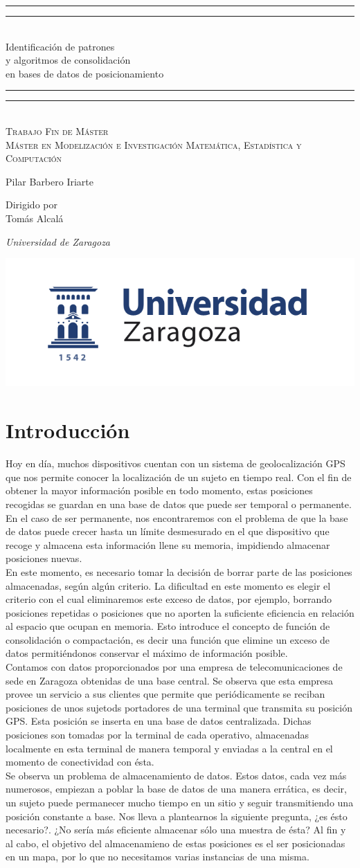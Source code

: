 \documentclass[a4paper, 12pt]{article}
\newcommand*{\plogo}{\includegraphics[scale=.45]{unizar.png}}
\newcommand*{\titleGP}{\begingroup %
\centering %
\vspace*{\baselineskip} %

\rule{\textwidth}{1.6pt}\vspace*{-\baselineskip}\vspace*{2pt} %
\rule{\textwidth}{0.4pt}\\[\baselineskip] %

{\LARGE Identificaci\'on de patrones \\[0.1\baselineskip] y algoritmos  de consolidaci\'on  \\[0.3\baselineskip] en bases de datos de posicionamiento}\\[0.2\baselineskip] %

\rule{\textwidth}{0.4pt}\vspace*{-\baselineskip}\vspace{3.2pt} %
\rule{\textwidth}{1.6pt}\\[\baselineskip] %

\scshape %
Trabajo Fin de M\'aster \\ %
M\'aster en Modelizaci\'on e Investigaci\'on Matem\'atica, Estad\'istica y Computaci\'on\\[\baselineskip] %
{\Large Pilar Barbero Iriarte\par} 

\vspace*{2\baselineskip} %

Dirigido por \\[\baselineskip]
Tom\'as Alcal\'a \par %
{\itshape Universidad de Zaragoza\par} %

\vfill %

\plogo \\[0.3\baselineskip] %

\endgroup}
\begin{document}
\titleGP %
\pagestyle{empty} %

\newpage\null\thispagestyle{empty}\newpage

\tableofcontents


\pagebreak


\section{Introducci\'on}

Hoy en d\'ia, muchos dispositivos cuentan con un sistema de geolocalizaci\'on GPS que nos permite conocer la localizaci\'on de un sujeto en tiempo real. Con el fin de obtener la mayor informaci\'on posible en todo momento, estas posiciones recogidas se guardan en una base de datos que puede ser temporal o permanente. En el caso de ser permanente, nos encontraremos con el problema de que la base de datos puede crecer hasta un l\'imite desmesurado en el que dispositivo que recoge y almacena esta informaci\'on llene su memoria, impidiendo almacenar posiciones nuevas. \\

En este momento, es necesario tomar la decisi\'on de borrar parte de las posiciones almacenadas, seg\'un alg\'un criterio. La dificultad en este momento es elegir el criterio con el cual eliminaremos este exceso de datos, por ejemplo, borrando posiciones repetidas o posiciones que no aporten la suficiente eficiencia en relaci\'on al espacio que ocupan en memoria. Esto introduce el concepto de funci\'on de consolidaci\'on o compactaci\'on, es decir una funci\'on que elimine un exceso de datos permiti\'endonos conservar el m\'aximo de informaci\'on posible. \\

Contamos con datos proporcionados por una empresa de telecomunicaciones de sede en Zaragoza obtenidas de una base central. Se observa que esta empresa provee un servicio a sus clientes que permite que peri\'odicamente se reciban posiciones de unos sujetods portadores de una terminal que transmita su posici\'on GPS. Esta posici\'on se inserta en una base de datos centralizada. Dichas posiciones son tomadas por la terminal de cada operativo, almacenadas localmente en esta terminal de manera temporal y enviadas a la central en el momento de conectividad con \'esta. \\

Se observa un problema de almacenamiento de datos. Estos datos, cada vez m\'as numerosos, empiezan a poblar la base de datos de una manera err\'atica, es decir, un sujeto puede permanecer mucho tiempo en un sitio y seguir transmitiendo una posici\'on constante a base. Nos lleva a plantearnos la siguiente pregunta, ¿es \'esto necesario?. ¿No ser\'ia m\'as eficiente almacenar s\'olo una muestra de \'esta? Al fin y al cabo, el objetivo del almacenamieno de estas posiciones es el ser posicionadas en un mapa, por lo que no necesitamos varias instancias de una misma. \\
\end{document}
